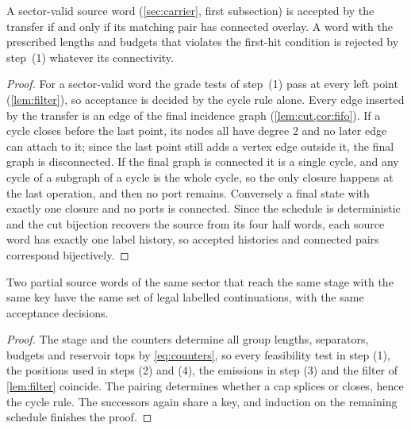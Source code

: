 \begin{lemma}
\label{lem:cycle}
\leanok
{}
A sector-valid source word (\cref{sec:carrier}, first subsection) is accepted
by the transfer if and only if its matching pair has connected overlay. A
word with the prescribed lengths and budgets that violates the first-hit
condition is rejected by step~(1) whatever its connectivity.
\end{lemma}

\begin{proof}
\leanok
For a sector-valid word the grade tests of step~(1) pass at every left point
(\cref{lem:filter}), so acceptance is decided by the cycle rule alone. Every
edge inserted by the transfer is an edge of the final incidence graph
(\cref{lem:cut,cor:fifo}). If a cycle closes before the last point, its nodes
all have degree $2$ and no later edge can attach to it; since the last point
still adds a vertex edge outside it, the final graph is disconnected. If the
final graph is connected it is a single cycle, and any cycle of a subgraph of a
cycle is the whole cycle, so the only closure happens at the last operation, and
then no port remains. Conversely a final state with exactly one closure and no
ports is connected. Since the schedule is deterministic and the cut bijection
recovers the source from its four half words, each source word has exactly
one label history, so accepted histories and connected pairs correspond
bijectively.
\end{proof}

\begin{lemma}
\label{lem:future}
\leanok
{}
Two partial source words of the same sector that reach the same stage with the
same key have the same set of legal labelled continuations, with the same
acceptance decisions.
\end{lemma}

\begin{proof}
\leanok
The stage and the counters determine all group lengths, separators, budgets and
reservoir tops by \eqref{eq:counters}, so every feasibility test in step (1),
the positions used in steps (2) and (4), the emissions in step (3) and the
filter of \cref{lem:filter} coincide. The pairing determines whether a cap
splices or closes, hence the cycle rule. The successors again share a key, and
induction on the remaining schedule finishes the proof.
\end{proof}

